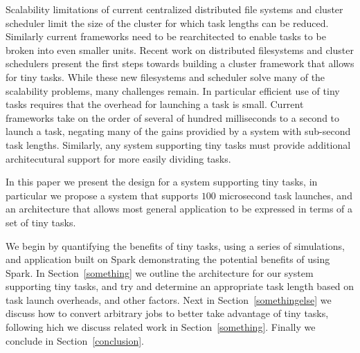 Scalability limitations of current centralized distributed file systems and cluster
scheduler limit the size of the cluster for which task lengths can be reduced. Similarly
current frameworks need to be rearchitected to enable tasks to be broken into even smaller
units. 
Recent work on distributed filesystems\cite{nightingale2012flat} and cluster schedulers\cite{sparrow}
present the first steps towards
building a cluster framework that allows for tiny tasks. While these new filesystems
and scheduler solve many of the scalability problems, many challenges remain. In particular
efficient use of tiny tasks requires that the overhead for launching a task is small. Current
frameworks take on the order of several of hundred milliseconds to a second to launch a task, negating
many of the gains providied by a system with sub-second task lengths. Similarly, any system
supporting tiny tasks must provide additional architecutural support for more easily dividing tasks.

In this paper we present the design for a system supporting tiny tasks, in particular
we propose a system that supports $100$ microsecond task launches, and an architecture
that allows most general application to be expressed in terms of a set of tiny tasks.

We begin by quantifying the benefits of tiny tasks, using a series of simulations, 
and application built on Spark\cite{zaharia2010spark} demonstrating the potential benefits
of using Spark. In Section~\ref{something} we outline the architecture for our system supporting tiny tasks, and 
try and determine an appropriate task length based on task launch overheads, and other factors.
Next in Section~\ref{somethingelse} we discuss how to convert arbitrary jobs to better take advantage of tiny tasks, following
hich we discuss related work in Section~\ref{something}. Finally we conclude in Section~\ref{conclusion}. 
